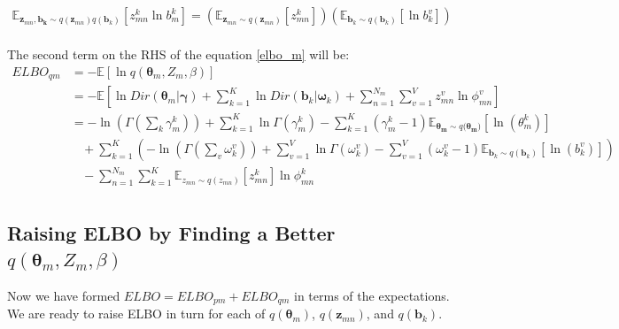 \documentclass[a4]{article}
\begin{document}
\begin{equation}
\begin{aligned}
\mathbb{E}_{ \mathbf{z}_{mn}, \bm{\mathbf{b}_k} \sim 
    q(\mathbf{z}_{mn})q(\mathbf{b}_k)}
        [z_{mn}^{k} \ln b_m^k] 
=
    \left( \mathbb{E}_{\mathbf{z}_{mn} \sim q(\mathbf{z}_{mn})}
        [z_{mn}^{k}] \right)
    \left( \mathbb{E}_{ \mathbf{b}_k \sim q( \mathbf{b}_k) } [ \ln b_k^v ]
    \right)\label{elbo_pm}\\
\end{aligned}
\end{equation}

The second term on the RHS of the equation \ref{elbo_m} will be:
\begin{equation}
\begin{aligned}
    ELBO_{qm}
    &= - \mathbb{E}\left[\ln q(\bm{\theta}_m , Z_{m}, \beta)\right]\\
    &= - \mathbb{E}\left[
        \ln Dir(\bm{\theta}_m | \bm{\gamma} )
        + \sum_{k = 1}^{K} \ln Dir(\mathbf{b}_k | \bm{\omega}_k )
        + \sum_{n = 1}^{N_m} \sum_{v=1}^V {z_{mn}^v} \ln \phi_{mn}^v
       \right]\\
    &=
      - \ln \left( \Gamma( \sum_k \gamma_{m}^k ) \right) 
          + \sum_{k=1}^{K} \ln \Gamma(\gamma_{m}^k) 
          - \sum_{k=1}^{K} (\gamma_{m}^k - 1)
            \mathbb{E}_{\bm{\theta_m} \sim q(\bm{\theta_m)}}[\ln(\theta_m^k)]\\
      &\:\:\:\:+\sum_{k = 1}^{K} \left(
      - \ln \left( \Gamma( \sum_v \omega_k^v ) \right) 
          + \sum_{v=1}^{V} \ln \Gamma(\omega_k^v) 
          - \sum_{v=1}^{V} (\omega_k^v - 1)
            \mathbb{E}_{\mathbf{b}_k \sim q(\mathbf{b}_k)}[\ln(b_k^v)]
      \right)\\
      &\:\:\:\:-\sum_{n = 1}^{N_m} \sum_{k=1}^K
          \mathbb{E}_{z_{mn} \sim q(z_{mn})}[z_{mn}^k] \ln \phi_{mn}^k\label{elbo_qm}\\
\end{aligned}
\end{equation}


\subsection{Raising ELBO by Finding a Better $q(\bm{\theta}_m , Z_{m}, \beta )$}
Now we have formed $ELBO = ELBO_{pm} + ELBO_{qm}$ in terms of the expectations.
We are ready to raise ELBO in turn for each of $q(\bm{\theta}_m)$, 
$q(\mathbf{z}_{mn})$, and $q(\mathbf{b}_{k})$.
\end{document}
